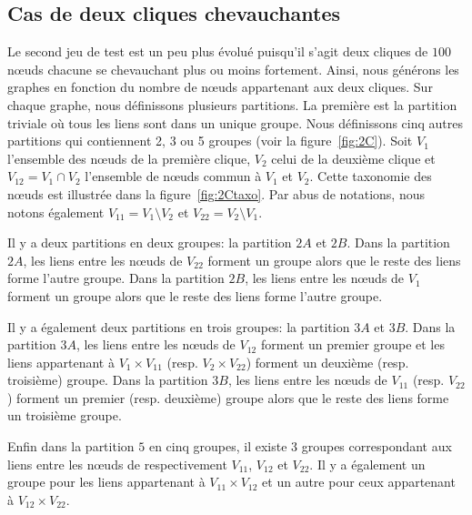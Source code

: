 \subsection{Cas de deux cliques chevauchantes}
\label{subsec:2cliques}

Le second jeu de test est un peu plus évolué puisqu'il s'agit deux cliques de $100$ n\oe{}uds chacune se chevauchant plus ou moins fortement.
Ainsi, nous générons les graphes en fonction du nombre de n\oe{}uds appartenant aux deux cliques.
Sur chaque graphe, nous définissons plusieurs partitions.
La première est la partition triviale où tous les liens sont dans un unique groupe.
Nous définissons cinq autres partitions qui contiennent 2, 3 ou 5 groupes (voir la figure~\ref{fig:2C}).
Soit $V_1$ l'ensemble des n\oe{}uds de la première clique, $V_2$ celui de la deuxième clique et $V_{12}=V_1 \cap V_2$ l'ensemble de n\oe{}uds commun à $V_1$ et $V_2$.
Cette taxonomie des n\oe{}uds est illustrée dans la figure~\ref{fig:2Ctaxo}.
Par abus de notations, nous notons également $V_{11}=V_1\setminus V_2$ et $V_{22}=V_2\setminus V_1$.

Il y a deux partitions en deux groupes: la partition $2A$ et $2B$.
Dans la partition $2A$, les liens entre les n\oe{}uds de $V_{22}$ forment un groupe alors que le reste des liens forme l'autre groupe.
Dans la partition $2B$, les liens entre les n\oe{}uds de $V_{1}$ forment un groupe alors que le reste des liens forme l'autre groupe.

Il y a également deux partitions en trois groupes: la partition $3A$ et $3B$.
Dans la partition $3A$, les liens entre les n\oe{}uds de $V_{12}$ forment un premier groupe et les liens appartenant à $V_1\times V_{11}$ (resp. $V_2\times V_{22}$) forment un deuxième (resp. troisième) groupe.
Dans la partition $3B$, les liens entre les n\oe{}uds de $V_{11}$ (resp. $V_{22}$) forment un premier (resp. deuxième) groupe alors que le reste des liens forme un troisième groupe.

Enfin dans la partition $5$ en cinq groupes, il existe 3 groupes correspondant aux liens entre les n\oe{}uds de respectivement $V_{11}$, $V_{12}$ et $V_{22}$.
Il y a également un groupe pour les liens appartenant à $V_{11} \times V_{12}$ et un autre pour ceux appartenant à $V_{12} \times V_{22}$.


